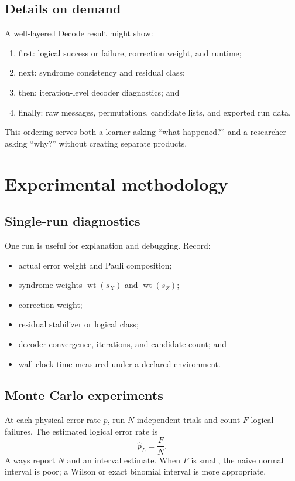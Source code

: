 \documentclass[11pt,letterpaper]{article}
\newcommand{\wt}{\operatorname{wt}}
\begin{document}
\subsection{Details on demand}

A well-layered Decode result might show:

\begin{enumerate}
  \item first: logical success or failure, correction weight, and runtime;
  \item next: syndrome consistency and residual class;
  \item then: iteration-level decoder diagnostics; and
  \item finally: raw messages, permutations, candidate lists, and exported run data.
\end{enumerate}

This ordering serves both a learner asking ``what happened?'' and a researcher asking ``why?''
without creating separate products.

\section{Experimental methodology}

\subsection{Single-run diagnostics}

One run is useful for explanation and debugging. Record:

\begin{itemize}
  \item actual error weight and Pauli composition;
  \item syndrome weights $\wt(s_X)$ and $\wt(s_Z)$;
  \item correction weight;
  \item residual stabilizer or logical class;
  \item decoder convergence, iterations, and candidate count; and
  \item wall-clock time measured under a declared environment.
\end{itemize}

\subsection{Monte Carlo experiments}

At each physical error rate $p$, run $N$ independent trials and count $F$ logical failures. The
estimated logical error rate is
\begin{equation}
  \widehat p_L=\frac{F}{N}.
\end{equation}
Always report $N$ and an interval estimate. When $F$ is small, the naive normal interval is poor;
a Wilson or exact binomial interval is more appropriate.
\end{document}
